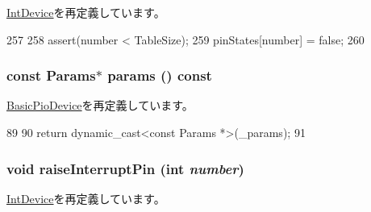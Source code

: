 \hyperlink{classX86ISA_1_1IntDevice_a1909001c0927e6a93d8bebf9d30bc11c}{IntDevice}を再定義しています。


\begin{DoxyCode}
257 {
258     assert(number < TableSize);
259     pinStates[number] = false;
260 }
\end{DoxyCode}
\hypertarget{classX86ISA_1_1I82094AA_acd3c3feb78ae7a8f88fe0f110a718dff}{
\subsubsection[{params}]{\setlength{\rightskip}{0pt plus 5cm}const {\bf Params}$\ast$ params () const}}
\label{classX86ISA_1_1I82094AA_acd3c3feb78ae7a8f88fe0f110a718dff}


\hyperlink{classBasicPioDevice_acd3c3feb78ae7a8f88fe0f110a718dff}{BasicPioDevice}を再定義しています。


\begin{DoxyCode}
89     {
90         return dynamic_cast<const Params *>(_params);
91     }
\end{DoxyCode}
\hypertarget{classX86ISA_1_1I82094AA_ac26dfa4264d910f3ef50015beafea211}{
\subsubsection[{raiseInterruptPin}]{\setlength{\rightskip}{0pt plus 5cm}void raiseInterruptPin (int {\em number})}}
\label{classX86ISA_1_1I82094AA_ac26dfa4264d910f3ef50015beafea211}


\hyperlink{classX86ISA_1_1IntDevice_a4bafbbd02159d7bdc6eae7f4197db84f}{IntDevice}を再定義しています。


